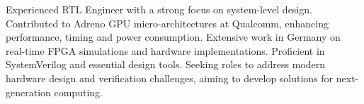 \begin{cvSummary}
Experienced RTL Engineer with a strong focus on system-level design. Contributed to Adreno GPU micro-architectures at Qualcomm, enhancing performance, timing and power consumption. Extensive work in Germany on real-time FPGA simulations and hardware implementations. Proficient in SystemVerilog and essential design tools. Seeking roles to address modern hardware design and verification challenges, aiming to develop solutions for next-generation computing.
\end{cvSummary}    